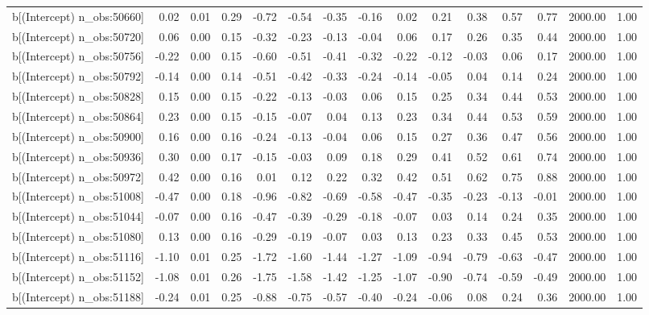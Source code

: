 \begin{table}[ht]
\begin{tabular}{rrrrrrrrrrrrrrr}
  b[(Intercept) n\_obs:50660] & 0.02 & 0.01 & 0.29 & -0.72 & -0.54 & -0.35 & -0.16 & 0.02 & 0.21 & 0.38 & 0.57 & 0.77 & 2000.00 & 1.00 \\ 
  b[(Intercept) n\_obs:50720] & 0.06 & 0.00 & 0.15 & -0.32 & -0.23 & -0.13 & -0.04 & 0.06 & 0.17 & 0.26 & 0.35 & 0.44 & 2000.00 & 1.00 \\ 
  b[(Intercept) n\_obs:50756] & -0.22 & 0.00 & 0.15 & -0.60 & -0.51 & -0.41 & -0.32 & -0.22 & -0.12 & -0.03 & 0.06 & 0.17 & 2000.00 & 1.00 \\ 
  b[(Intercept) n\_obs:50792] & -0.14 & 0.00 & 0.14 & -0.51 & -0.42 & -0.33 & -0.24 & -0.14 & -0.05 & 0.04 & 0.14 & 0.24 & 2000.00 & 1.00 \\ 
  b[(Intercept) n\_obs:50828] & 0.15 & 0.00 & 0.15 & -0.22 & -0.13 & -0.03 & 0.06 & 0.15 & 0.25 & 0.34 & 0.44 & 0.53 & 2000.00 & 1.00 \\ 
  b[(Intercept) n\_obs:50864] & 0.23 & 0.00 & 0.15 & -0.15 & -0.07 & 0.04 & 0.13 & 0.23 & 0.34 & 0.44 & 0.53 & 0.59 & 2000.00 & 1.00 \\ 
  b[(Intercept) n\_obs:50900] & 0.16 & 0.00 & 0.16 & -0.24 & -0.13 & -0.04 & 0.06 & 0.15 & 0.27 & 0.36 & 0.47 & 0.56 & 2000.00 & 1.00 \\ 
  b[(Intercept) n\_obs:50936] & 0.30 & 0.00 & 0.17 & -0.15 & -0.03 & 0.09 & 0.18 & 0.29 & 0.41 & 0.52 & 0.61 & 0.74 & 2000.00 & 1.00 \\ 
  b[(Intercept) n\_obs:50972] & 0.42 & 0.00 & 0.16 & 0.01 & 0.12 & 0.22 & 0.32 & 0.42 & 0.51 & 0.62 & 0.75 & 0.88 & 2000.00 & 1.00 \\ 
  b[(Intercept) n\_obs:51008] & -0.47 & 0.00 & 0.18 & -0.96 & -0.82 & -0.69 & -0.58 & -0.47 & -0.35 & -0.23 & -0.13 & -0.01 & 2000.00 & 1.00 \\ 
  b[(Intercept) n\_obs:51044] & -0.07 & 0.00 & 0.16 & -0.47 & -0.39 & -0.29 & -0.18 & -0.07 & 0.03 & 0.14 & 0.24 & 0.35 & 2000.00 & 1.00 \\ 
  b[(Intercept) n\_obs:51080] & 0.13 & 0.00 & 0.16 & -0.29 & -0.19 & -0.07 & 0.03 & 0.13 & 0.23 & 0.33 & 0.45 & 0.53 & 2000.00 & 1.00 \\ 
  b[(Intercept) n\_obs:51116] & -1.10 & 0.01 & 0.25 & -1.72 & -1.60 & -1.44 & -1.27 & -1.09 & -0.94 & -0.79 & -0.63 & -0.47 & 2000.00 & 1.00 \\ 
  b[(Intercept) n\_obs:51152] & -1.08 & 0.01 & 0.26 & -1.75 & -1.58 & -1.42 & -1.25 & -1.07 & -0.90 & -0.74 & -0.59 & -0.49 & 2000.00 & 1.00 \\ 
  b[(Intercept) n\_obs:51188] & -0.24 & 0.01 & 0.25 & -0.88 & -0.75 & -0.57 & -0.40 & -0.24 & -0.06 & 0.08 & 0.24 & 0.36 & 2000.00 & 1.00 \\ 

\end{tabular}
\end{table}
